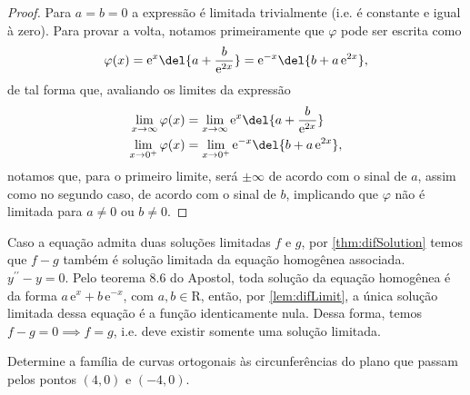 \documentclass{IMTexam}
\begin{document}
\begin{questions}
\begin{solution}
            \begin{proof}
                Para $a=b=0$ a expressão é limitada trivialmente (i.e. é
                constante e igual à zero). Para provar a volta, notamos
                primeiramente que $\varphi$ pode ser escrita como
                \[
                    \varphi(x)=\mathrm{e}^x\del{a+\dfrac{b}{\mathrm{e}^{2x}}} =
                    \mathrm{e}^{-x}\del{b+a\,\mathrm{e}^{2x}},
                \]
                de tal forma que, avaliando os limites da expressão
                \begin{align*}
                    \lim\limits_{x\to\infty} \varphi(x)&=\lim\limits_{x\to\infty}
                    \mathrm{e}^x\del{a+\dfrac{b}{\mathrm{e}^{2x}}}\\
                    \lim\limits_{x\to0^+} \varphi(x)&=\lim\limits_{x\to0^+}
                    \mathrm{e}^{-x}\del{b+a\,\mathrm{e}^{2x}},
                \end{align*}
                notamos que, para o primeiro limite, será $\pm\infty$ de acordo
                com o sinal de $a$, assim como no segundo caso, de acordo com o
                sinal de $b$, implicando que $\varphi$ não é limitada para
                $a\neq0$ ou $b\neq0$.
            \end{proof}

            Caso a equação admita duas soluções limitadas $f$ e $g$, por
            \ref{thm:difSolution} temos que $f-g$ também é solução limitada da
            equação homogênea associada.
            $y^{\prime\prime} - y=0$. Pelo teorema 8.6 do Apostol, toda solução
            da equação homogênea é da forma
            $a\,\mathrm{e}^x+b\,\mathrm{e}^{-x}$, com $a,b\in\mathrm{R}$,
            então, por \ref{lem:difLimit}, a única solução limitada dessa
            equação é a função identicamente nula. Dessa forma, temos
            $f-g=0\implies f=g$, i.e. deve existir somente uma solução
            limitada.
        \end{solution}

        \question Determine a família de curvas ortogonais às circunferências
        do plano que passam pelos pontos $(4,0)$ e $(-4,0)$.


\end{questions}
\end{document}
